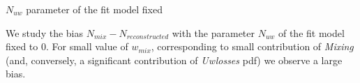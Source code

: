 \documentclass[9pt]{beamer}
\newcommand{\nologo}{\setbeamertemplate{logo}{}}
\begin{document}
{\nologo
\begin{frame}{$N_{uw}$ parameter of the fit model fixed}

We study the bias $N_{mix} - N_{reconstructed}$ with the parameter $N_{uw}$ of the fit model fixed to $0$. For small value of $w_{mix}$, corresponding to small contribution of \textit{Mixing}  (and, conversely, a significant contribution of \textit{Uwlosses} pdf) we observe a large bias.

\begin{figure}
\end{figure}
\end{frame}
}
\end{document}
